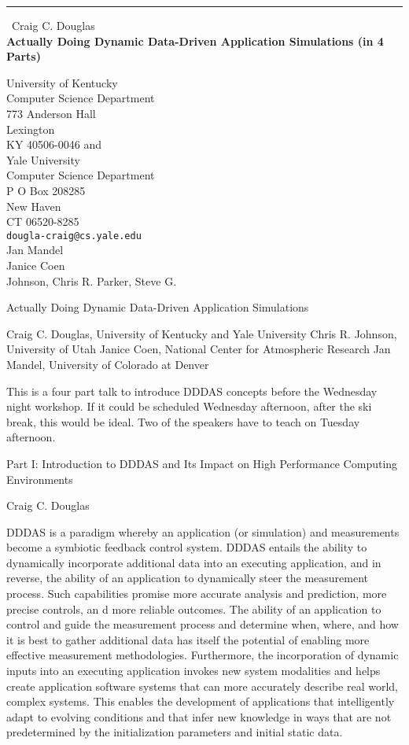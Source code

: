 \documentclass{report}
\begin{document}
\begin{center}
\rule{6in}{1pt} \
{\large Craig C. Douglas \\
{\bf Actually Doing Dynamic Data-Driven Application Simulations (in 4 Parts)}}

University of Kentucky \\ Computer Science Department \\ 773 Anderson Hall \\ Lexington \\ KY 40506-0046 and \\ Yale University \\ Computer Science Department \\ P O Box 208285 \\ New Haven \\ CT 06520-8285
\\
{\tt dougla-craig@cs.yale.edu}\\
Jan Mandel\\
Janice Coen\\
	Johnson, Chris R.
	Parker, Steve G.\end{center}

Actually Doing Dynamic Data-Driven Application Simulations

Craig C. Douglas, University of Kentucky and Yale University
Chris R. Johnson, University of Utah
Janice Coen, National Center for Atmospheric Research
Jan Mandel, University of Colorado at Denver

This is a four part talk to introduce DDDAS concepts before the Wednesday
night workshop. If it could be scheduled Wednesday afternoon, after the
ski break, this would be ideal. Two of the speakers have to teach on
Tuesday afternoon.

Part I: Introduction to DDDAS and Its Impact on High Performance Computing Environments

Craig C. Douglas

DDDAS is a paradigm whereby an application (or simulation) and
measurements become a symbiotic feedback control system. DDDAS entails
the ability to dynamically incorporate additional data into an executing
application, and in reverse, the ability of an application to dynamically
steer the measurement process. Such capabilities promise more accurate
analysis and prediction, more precise controls, an d more reliable
outcomes. The ability of an application to control and guide the
measurement process and determine when, where, and how it is best to
gather additional data has itself the potential of enabling more
effective measurement methodologies. Furthermore, the incorporation of
dynamic inputs into an executing application invokes new system
modalities and helps create application software systems that can more
accurately describe real world, complex systems. This enables the
development of applications that intelligently adapt to evolving
conditions and that infer new knowledge in ways that are not
predetermined by the initialization parameters and initial static data.
\end{document}
